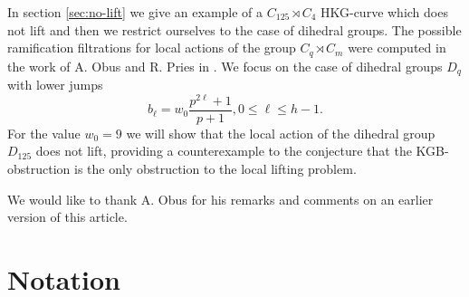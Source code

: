 \documentclass[11pt,letterpaper]{amsart}
\theoremstyle{definition}
\begin{document}
In section \ref{sec:no-lift} 
we give an example of a $C_{125} \rtimes C_4$ HKG-curve which does not lift and then we restrict ourselves to the case of dihedral groups. 
The possible ramification filtrations for local actions of the group $C_q \rtimes C_m$ were computed in the work of A. Obus and R. Pries in \cite{MR2577662}. 
We focus on the case of dihedral groups $D_q$ with lower jumps
\begin{equation}
\label{eq:jumpsPO}
  b_\ell = w_0\frac{p^{2 \ell}+1}{p+1}, 0 \leq \ell \leq h-1.
\end{equation}
For the {value}  $w_0=9$ we will show that the local action of the dihedral group $D_{125}$ does not lift, providing a counterexample to the conjecture that the KGB-obstruction is the only obstruction to the local lifting problem. 



We would like to thank A. Obus for his remarks and comments on an earlier version of this article. 


%
%
%
\section{Notation}
%
%
%
\end{document}

